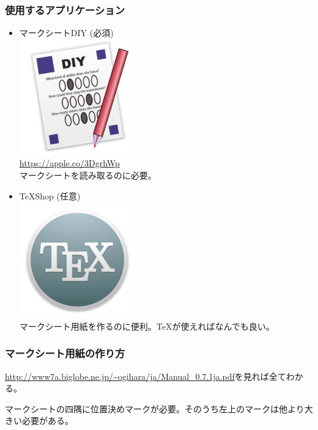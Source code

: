 \documentclass[dvipdfmx,jb5]{jarticle}
\begin{document}
\subsubsection{使用するアプリケーション}
\begin{itemize}
 \item マークシートDIY {\color{red}(必須)}\\
 \includegraphics[width=5cm]{assets/answersheet-diy.png}\\
 \url{https://apple.co/3DgrhWp}\\
 マークシートを読み取るのに必要。
 \item \TeX Shop (任意)\\
 \includegraphics[width=5cm]{assets/TeX.png}\\
 マークシート用紙を作るのに便利。\TeX が使えればなんでも良い。
\end{itemize}
 \subsubsection{マークシート用紙の作り方}
 \url{http://www7a.biglobe.ne.jp/~ogihara/ja/Manual_0.7.1ja.pdf}を見れば全てわかる。

 マークシートの四隅に位置決めマークが必要。そのうち左上のマークは他より大きい必要がある。
\end{document}

